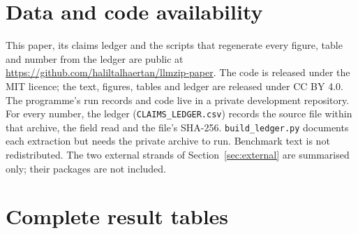 \documentclass[11pt,a4paper]{article}
\begin{document}
\section{Data and code availability}
This paper, its claims ledger and the scripts that regenerate every figure, table and number from the ledger are public at \url{https://github.com/haliltalhaertan/llmzip-paper}. The code is released under the MIT licence; the text, figures, tables and ledger are released under CC BY 4.0. The programme's run records and code live in a private development repository. For every number, the ledger (\texttt{CLAIMS\_LEDGER.csv}) records the source file within that archive, the field read and the file's SHA-256. \texttt{build\_ledger.py} documents each extraction but needs the private archive to run. Benchmark text is not redistributed. The two external strands of Section~\ref{sec:external} are summarised only; their packages are not included.




\FloatBarrier
\clearpage
\appendix
\section{Complete result tables}





\end{document}
